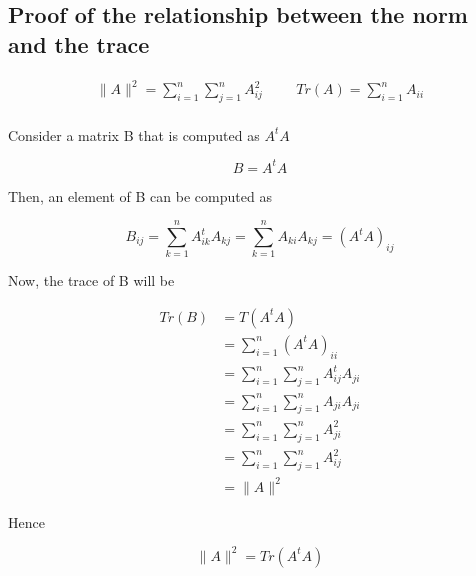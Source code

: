 \documentclass[12pt,journal]{IEEEtran}
\begin{document}
    \subsection{Proof of the relationship between the norm and the trace} \label{norm_trace}

    \begin{equation*}
        \begin{aligned}
            \lVert A \rVert^2 = \sum_{i=1}^n \sum_{j=1}^n A_{ij}^2
            \hspace{1cm}
            Tr(A) = \sum_{i=1}^n A_{ii}
        \end{aligned}
    \end{equation*}\\

    Consider a matrix B that is computed as $A^tA$

    \begin{equation*}
        B = A^tA
    \end{equation*}

    Then, an element of B can be computed as

    \begin{equation*}
        B_{ij} = \sum_{k=1}^n A_{ik}^t A_{kj} = \sum_{k=1}^n A_{ki} A_{kj} = (A^tA)_{ij}
    \end{equation*}

    Now, the trace of B will be

    \begin{equation*}
        \begin{aligned}
            Tr(B) &= T(A^tA)\\
                  &= \sum_{i=1}^n (A^tA)_{ii}\\
                  &= \sum_{i=1}^n \sum_{j=1}^n A_{ij}^t A_{ji}\\
                  &= \sum_{i=1}^n \sum_{j=1}^n A_{ji} A_{ji}\\
                  &= \sum_{i=1}^n \sum_{j=1}^n A_{ji}^2 \\
                  &= \sum_{i=1}^n \sum_{j=1}^n A_{ij}^2 \\
                  &= \lVert A \rVert^2
        \end{aligned}
    \end{equation*}

    Hence

    \begin{equation*}
        \lVert A \rVert^2 = Tr(A^tA)
    \end{equation*}
\end{document}
